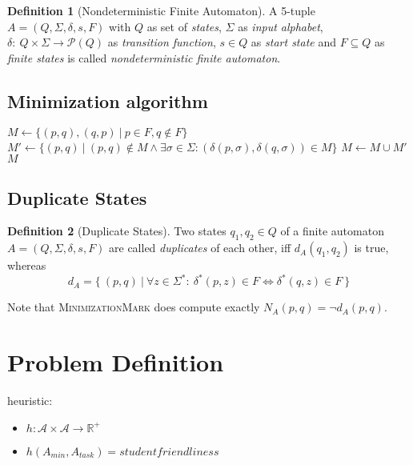 \documentclass[a4paper, oneside, 11pt]{report}
\theoremstyle{definition}
\newtheorem{definition}{Definition}
\theoremstyle{remark}
\begin{document}
\begin{definition}[Nondeterministic Finite Automaton]
	A 5-tuple $A = (Q, \Sigma, \delta, s, F)$ with $Q$ as set of \emph{states}, $\Sigma$ as \emph{input alphabet}, $\delta \colon\ Q \times \Sigma \to \mathcal{P}(Q)$ as \emph{transition function}, $s \in Q$ as \emph{start state} and $F \subseteq Q$ as \emph{finite states} is called \emph{nondeterministic finite automaton}.
\end{definition}

\subsection{Minimization algorithm}

\begin{algorithmic}[1]
	\State $M \gets \{ (p,q), (q,p)\ |\ p \in F, q \notin F \}$
	\Do
		\State $M' \gets \{ (p,q)\ |\ (p,q) \notin M \land \exists \sigma \in \Sigma \colon (\delta(p,\sigma), \delta(q,\sigma)) \in M \}$
		\State $M \gets M \cup M'$
	\State \Return $M$
	\EndFunction
\end{algorithmic}

\subsection{Duplicate States}

\begin{definition}[Duplicate States]
	Two states $q_1, q_2 \in Q$ of a finite automaton $A = (Q, \Sigma, \delta, s, F)$ are called \emph{duplicates} of each other, iff $d_A(q_1, q_2)$ is true, whereas
	\[
	d_A = \{\ (p, q)\ |\ \forall z \in \Sigma^* \colon\ \delta^*(p, z) \in F \Leftrightarrow \delta^*(q, z) \in F\ \}
	\]
\end{definition}
\noindent Note that \textsc{MinimizationMark} does compute exactly $N_A(p,q) = \neg d_A(p, q)$.

\section{Problem Definition}

heuristic:
\begin{itemize}
	\item $h \colon \mathcal{A} \times \mathcal{A} \to \mathbb{R^+}$
	\item $h(A_{min}, A_{task}) = studentfriendliness$
\end{itemize}
\end{document}
